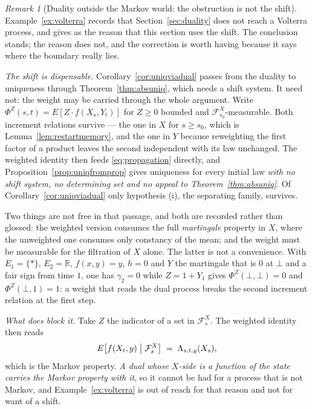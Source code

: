 \documentclass[11pt,a4paper]{article}
\theoremstyle{plain}
\theoremstyle{definition}
\theoremstyle{remark}
\newtheorem{remark}[theorem]{Remark}
\newcommand{\R}{\mathbb{R}}
\newcommand{\Filt}{\mathcal{F}}
\begin{document}
\begin{remark}[Duality outside the Markov world: the obstruction is not the shift]
  \label{rem:dualnonmarkov}
  Example~\ref{ex:volterra} records that Section~\ref{sec:duality} does not reach
  a Volterra process, and gives as the reason that this section uses the shift.
  The conclusion stands; the reason does not, and the correction is worth having
  because it says where the boundary really lies.

  \emph{The shift is dispensable.}  Corollary~\ref{cor:uniqviadual} passes from
  the duality to uniqueness through Theorem~\ref{thm:absuniq}, which needs a
  shift system.  It need not: the weight may be carried through the whole
  argument.  Write $\Phi^Z(s,t) = E[Z \cdot f(X_s,Y_t)]$ for $Z \geq 0$ bounded
  and $\Filt^X_{s_0}$-measurable.  Both increment relations survive --- the one
  in $X$ for $s \geq s_0$, which is Lemma~\ref{lem:restartmemory}, and the one in
  $Y$ because reweighting the first factor of a product leaves the second
  independent with its law unchanged.  The weighted identity then feeds
  \eqref{eq:propagation} directly, and Proposition~\ref{prop:uniqfromprop}
  gives uniqueness for every initial law \emph{with no shift system, no
  determining set and no appeal to Theorem~\ref{thm:absuniq}}.  Of
  Corollary~\ref{cor:uniqviadual} only hypothesis (i), the separating family,
  survives.

  Two things are not free in that passage, and both are recorded rather than
  glossed: the weighted version consumes the full \emph{martingale} property in
  $X$, where the unweighted one consumes only constancy of the mean; and the
  weight must be measurable for the filtration of $X$ alone.  The latter is not
  a convenience.  With $E_1 = \{*\}$, $E_2 = \R$, $f(x,y) = y$, $h = 0$ and $Y$
  the martingale that is $0$ at $\bot$ and a fair sign from time $1$, one has
  $\gamma_2 = 0$ while $Z = 1 + Y_1$ gives $\Phi^Z(\bot,\bot) = 0$ and
  $\Phi^Z(\bot,1) = 1$: a weight that reads the dual process breaks the second
  increment relation at the first step.

  \emph{What does block it.}  Take $Z$ the indicator of a set in
  $\Filt^X_s$.  The weighted identity then reads
  \[
    E\bigl[ f(X_t,y) \bigm| \Filt^X_s \bigr] \;=\; \Lambda_{s,t,y}(X_s) ,
  \]
  which is the Markov property.  \emph{A dual whose $X$-side is a function of the
  state carries the Markov property with it}, so it cannot be had for a process
  that is not Markov, and Example~\ref{ex:volterra} is out of reach for that
  reason and not for want of a shift.


\end{remark}
\end{document}
